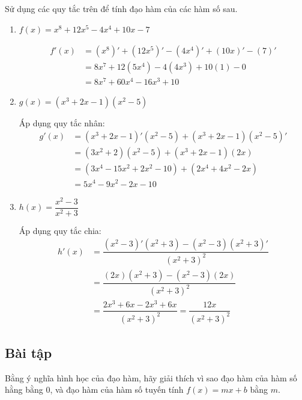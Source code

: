 \begin{example}
Sử dụng các quy tắc trên để tính đạo hàm của các hàm số sau.
\begin{enumerate}[label=(\alph*)]
    \item $f(x) = x^8 + 12x^5 - 4x^4 + 10x - 7$
    \begin{solution}
    \begin{align*}
    f'(x) &= (x^8)' + (12x^5)' - (4x^4)' + (10x)' - (7)' \\
    &= 8x^7 + 12(5x^4) - 4(4x^3) + 10(1) - 0 \\
    &= 8x^7 + 60x^4 - 16x^3 + 10
    \end{align*}
    \end{solution}
    
    \item $g(x) = (x^3 + 2x - 1)(x^2 - 5)$
    \begin{solution}
    Áp dụng quy tắc nhân:
    \begin{align*}
    g'(x) &= (x^3 + 2x - 1)'(x^2 - 5) + (x^3 + 2x - 1)(x^2 - 5)' \\
    &= (3x^2 + 2)(x^2 - 5) + (x^3 + 2x - 1)(2x) \\
    &= (3x^4 - 15x^2 + 2x^2 - 10) + (2x^4 + 4x^2 - 2x) \\
    &= 5x^4 - 9x^2 - 2x - 10
    \end{align*}
    \end{solution}
    
    \item $h(x) = \dfrac{x^2 - 3}{x^2 + 3}$
    \begin{solution}
    Áp dụng quy tắc chia:
    \begin{align*}
    h'(x) &= \dfrac{(x^2 - 3)'(x^2 + 3) - (x^2 - 3)(x^2 + 3)'}{(x^2 + 3)^2} \\
    &= \dfrac{(2x)(x^2 + 3) - (x^2 - 3)(2x)}{(x^2 + 3)^2} \\
    &= \dfrac{2x^3 + 6x - 2x^3 + 6x}{(x^2 + 3)^2} = \dfrac{12x}{(x^2 + 3)^2}
    \end{align*}
    \end{solution}
\end{enumerate}
\end{example}

\subsection{Bài tập}

\begin{exercise}
Bằng ý nghĩa hình học của đạo hàm, hãy giải thích vì sao đạo hàm của hàm số hằng bằng 0, và đạo hàm của hàm số tuyến tính $f(x) = mx + b$ bằng $m$.
\end{exercise}


